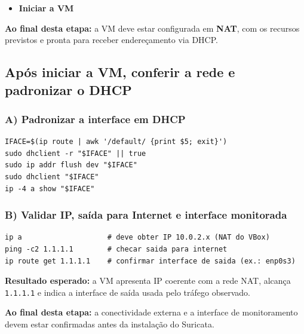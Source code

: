 
\begin{itemize}
  \item \textbf{Iniciar a VM}
\end{itemize}

\begin{notebox}
\textbf{Ao final desta etapa:} a VM deve estar configurada em \textbf{NAT}, com os recursos previstos e pronta para receber endereçamento via DHCP.
\end{notebox}

\subsection{Após iniciar a VM, conferir a rede e padronizar o DHCP}

\subsubsection*{A) Padronizar a interface em DHCP}

\begin{lstlisting}
IFACE=$(ip route | awk '/default/ {print $5; exit}')
sudo dhclient -r "$IFACE" || true
sudo ip addr flush dev "$IFACE"
sudo dhclient "$IFACE"
ip -4 a show "$IFACE"
\end{lstlisting}


\subsubsection*{B) Validar IP, saída para Internet e interface monitorada}

\begin{lstlisting}
ip a                    # deve obter IP 10.0.2.x (NAT do VBox)
ping -c2 1.1.1.1        # checar saida para internet
ip route get 1.1.1.1    # confirmar interface de saida (ex.: enp0s3)
\end{lstlisting}


\begin{notebox}
\textbf{Resultado esperado:} a VM apresenta IP coerente com a rede NAT, alcança \texttt{1.1.1.1} e indica a interface de saída usada pelo tráfego observado.

\textbf{Ao final desta etapa:} a conectividade externa e a interface de monitoramento devem estar confirmadas antes da instalação do Suricata.
\end{notebox}

